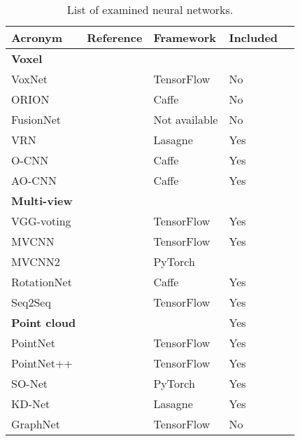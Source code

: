 \begin{table}[]
	\begin{tabular}{lllll}
		\hline
		\textbf{Acronym}       & \textbf{Reference}                       & \textbf{Framework} & \textbf{Included} &  \\ \hline
		\textbf{Voxel }        &                                          &                    &                   &  \\
		VoxNet                 & \cite{maturana_voxnet:_2015}             & TensorFlow         & No                &  \\
		ORION                  & \cite{sedaghat_orientation-boosted_2016} & Caffe              & No                &  \\
		FusionNet              & \cite{hegde_fusionnet:_2016}             & Not available      & No                &  \\
		VRN                    & \cite{brock_generative_2016}             & Lasagne            & Yes               &  \\
		O-CNN                  & \cite{wang_o-cnn:_2017}                  & Caffe              & Yes               &  \\
		AO-CNN                 & \cite{wang_adaptive_2018}                & Caffe              & Yes               &  \\
		\textbf{Multi-view }   &                                          &                    &                   &  \\
		VGG-voting             & \cite{simonyan_very_2014}                & TensorFlow         & Yes               &  \\
		MVCNN                  & \cite{su_multi-view_2015}                & TensorFlow         & Yes               &  \\
		MVCNN2                 & \cite{su_deeper_2018}                    & PyTorch            &                   &  \\
		RotationNet            & \cite{kanezaki_rotationnet:_2016}        & Caffe              & Yes               &  \\
		Seq2Seq                & \cite{zhizhong_seqviews2seqlabels:_2018} & TensorFlow         & Yes               &  \\
		\textbf{Point cloud  } &                                          &                    & Yes               &  \\
		PointNet               & \cite{qi_pointnet:_2016}                 & TensorFlow         & Yes               &  \\
		PointNet++             & \cite{qi_pointnet++:_2017}               & TensorFlow         & Yes               &  \\
		SO-Net                 & \cite{li_so-net:_2018}                   & PyTorch            & Yes               &  \\
		KD-Net                 & \cite{klokov_escape_2017}                & Lasagne            & Yes               &  \\
		GraphNet               & \cite{dominguez_general-purpose_2018}    & TensorFlow         & No                &
	\end{tabular}
\caption{List of examined neural networks.}
\label{Table:1}
\end{table}